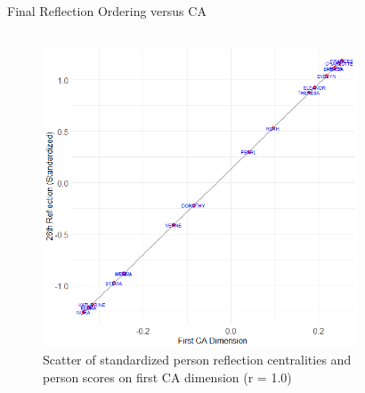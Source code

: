 \documentclass[
  ignorenonframetext,
]{beamer}
\begin{document}
\begin{frame}{Final Reflection Ordering versus CA}
\protect\hypertarget{final-reflection-ordering-versus-ca-2}{}
\begin{columns}[T]
\begin{column}{0.5\textwidth}
\begin{figure}

{\centering \includegraphics{Plots/p-ca-ref-corr-sw.png}

}

\caption{Scatter of standardized person reflection centralities and
person scores on first CA dimension (r = 1.0)}

\end{figure}
\end{column}

\begin{column}{0.5\textwidth}
\begin{figure}


\end{figure}
\end{column}
\end{columns}
\end{frame}
\end{document}
